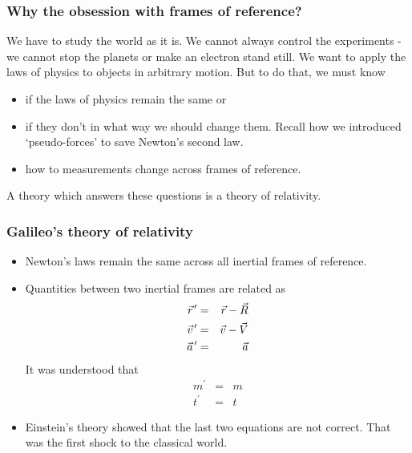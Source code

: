 \documentclass{beamer}
\newcommand{\pvec}[1]{\vec{#1}\mkern2mu\vphantom{#1}}
\begin{document}
\begin{frame}
\frametitle{Why the obsession with frames of reference?}
We have to study the world as it is. We cannot always control the experiments -
we cannot stop the planets or make an electron stand still. We want to apply
the laws of physics to objects in arbitrary motion. But to do that, we must 
know 
\begin{itemize}
\item if the laws of physics remain the same or
\item if they don't in what way we should change them. Recall how we introduced
`pseudo-forces' to save Newton's second law.
\item how to measurements change across frames of reference. 
\end{itemize}
A theory which answers these questions is a theory of relativity.
\end{frame}

\begin{frame}
\frametitle{Galileo's theory of relativity}
\begin{itemize}
\item Newton's laws remain the same across all inertial frames of reference.
\item Quantities between two inertial frames are related as
\begin{eqnarray}
\pvec{r}^\prime &=& \vec{r} - \vec{R} \label{4} \\
\pvec{v}^\prime &=& \vec{v} - \vec{V} \label{5} \\
\pvec{a}^\prime &=& \vec{a}           \label{6} 
\end{eqnarray}
It was understood that 
\begin{eqnarray}
m^\prime &=& m \label{e7} \\
t^\prime &=& t \label{e8}
\end{eqnarray}
\item Einstein's theory showed that the last two equations are not correct. 
That was the first shock to the classical world.
\end{itemize}
\end{frame}
\end{document}

